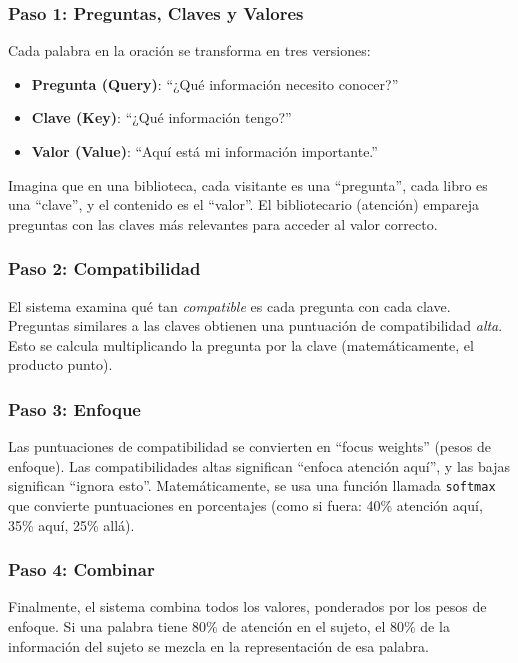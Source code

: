 \documentclass[11pt,a4paper]{article}
\begin{document}
\subsubsection{Paso 1: Preguntas, Claves y Valores}

Cada palabra en la oración se transforma en tres versiones:
\begin{itemize}[leftmargin=*]
    \item \textbf{Pregunta (Query)}: ``¿Qué información necesito conocer?''
    \item \textbf{Clave (Key)}: ``¿Qué información tengo?''
    \item \textbf{Valor (Value)}: ``Aquí está mi información importante.''
\end{itemize}

Imagina que en una biblioteca, cada visitante es una ``pregunta'', cada libro es una ``clave'', y el contenido es el ``valor''. El bibliotecario (atención) empareja preguntas con las claves más relevantes para acceder al valor correcto.

\subsubsection{Paso 2: Compatibilidad}

El sistema examina qué tan \emph{compatible} es cada pregunta con cada clave. Preguntas similares a las claves obtienen una puntuación de compatibilidad \emph{alta}. Esto se calcula multiplicando la pregunta por la clave (matemáticamente, el producto punto).

\subsubsection{Paso 3: Enfoque}

Las puntuaciones de compatibilidad se convierten en ``focus weights'' (pesos de enfoque). Las compatibilidades altas significan ``enfoca atención aquí'', y las bajas significan ``ignora esto''. Matemáticamente, se usa una función llamada \texttt{softmax} que convierte puntuaciones en porcentajes (como si fuera: 40\% atención aquí, 35\% aquí, 25\% allá).

\subsubsection{Paso 4: Combinar}

Finalmente, el sistema combina todos los valores, ponderados por los pesos de enfoque. Si una palabra tiene 80\% de atención en el sujeto, el 80\% de la información del sujeto se mezcla en la representación de esa palabra.
\end{document}
